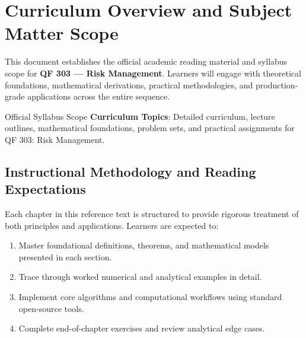 \section{Curriculum Overview and Subject Matter Scope}

This document establishes the official academic reading material and syllabus scope for \textbf{QF 303 --- Risk Management}. Learners will engage with theoretical foundations, mathematical derivations, practical methodologies, and production-grade applications across the entire sequence.

\begin{InsightBox}{Official Syllabus Scope}
  \textbf{Curriculum Topics}: Detailed curriculum, lecture outlines, mathematical foundations, problem sets, and practical assignments for QF 303: Risk Management.
\end{InsightBox}

\subsection{Instructional Methodology and Reading Expectations}

Each chapter in this reference text is structured to provide rigorous treatment of both principles and applications. Learners are expected to:
\begin{enumerate}
  \item Master foundational definitions, theorems, and mathematical models presented in each section.
  \item Trace through worked numerical and analytical examples in detail.
  \item Implement core algorithms and computational workflows using standard open-source tools.
  \item Complete end-of-chapter exercises and review analytical edge cases.
\end{enumerate}

